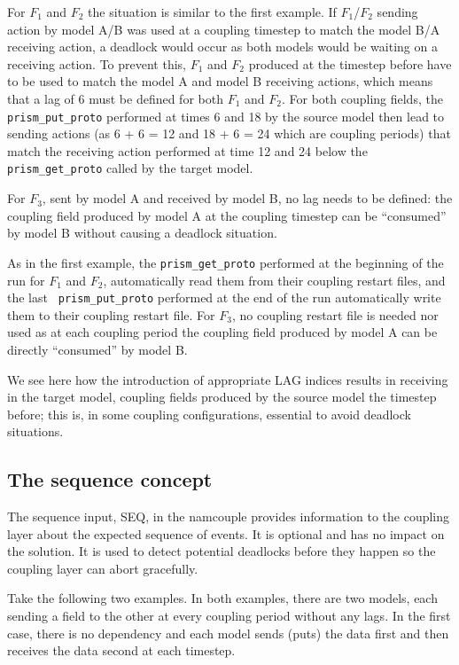 \begin{enumerate}
  For $F_1$ and $F_2$ the situation is similar to the first
  example. If $F_1$/$F_2$ sending action by model A/B was used at a
  coupling timestep to match the model B/A receiving action, a
  deadlock would occur as both models would be waiting on a receiving
  action. To prevent this, $F_1$ and $F_2$ produced at the timestep
  before have to be used to match the model A and model B receiving
  actions, which means that a lag of 6 must be defined for both $F_1$
  and $F_2$. For both coupling fields, the {\tt prism\_put\_proto}
  performed at times 6 and 18 by the source model then lead to sending
  actions (as 6 + 6 = 12 and 18 + 6 = 24 which are coupling periods)
  that match the receiving action performed at time 12 and 24 below
  the {\tt prism\_get\_proto} called by the target model.

  For $F_3$, sent by model A and received by model B, no lag
  needs to be defined: the coupling field produced by model A at the
  coupling timestep can be ``consumed'' by model B without causing a
  deadlock situation.

  As in the first example, the {\tt prism\_get\_proto} performed at
  the beginning of the run for $F_1$ and $F_2$, automatically read
  them from their coupling restart files, and the last {\tt
  prism\_put\_proto} performed at the end of the run automatically
  write them to their coupling restart file. For $F_3$, no coupling
  restart file is needed nor used as at each coupling period the
  coupling field produced by model A can be directly ``consumed'' by
  model B.

  We see here how the introduction of appropriate LAG indices results in
  receiving in the target model,
  coupling fields produced by the
  source model the timestep before; this is, in some coupling
  configurations, essential to avoid deadlock situations.

  \end{enumerate}

\subsection{The sequence concept}

The sequence input, SEQ, in the namcouple provides information to
the coupling layer about the expected sequence of events.  It is
optional and has no impact on the solution.  It is used to detect
potential deadlocks before they happen so the coupling layer can
abort gracefully.

Take the following two examples.  In both examples, there are two
models, each sending a field to the other at every coupling period
without any lags.  In the first case, there is no dependency and 
each model sends (puts) the data first and then receives the data
second at each timestep.

